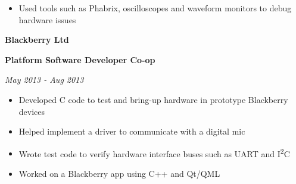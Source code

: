 \documentclass{article}
\newenvironment{name}{\fontfamily{phv}\selectfont\bfseries\normalsize}{\par}
\newenvironment{colorheading}{\fontfamily{phv}\selectfont\bfseries\normalsize\color{darkcyan}}{\par}
\newenvironment{metadata}{\fontfamily{phv}\selectfont\itshape\small\color{darkgray}}{\par}
\newenvironment{itemizedbody}{\fontfamily{phv}\selectfont\small\begin{itemize}}{\end{itemize}\par}
\newenvironment{experience}[2]%
{%
	\begin{minipage}{0.6\linewidth}\begin{flushleft}#1\end{flushleft}\end{minipage}%
	\hfill%
	\begin{minipage}{0.3\linewidth}\begin{flushright}#2\end{flushright}\end{minipage}%
}%
{}
\newcommand{\lineitem}{\item[{$\to$}]}
\begin{document}
\begin{minipage}[t]{0.6\linewidth}
\begin{itemizedbody}
  	  \lineitem Used tools such as Phabrix, oscilloscopes and waveform monitors to debug hardware issues
		\end{itemizedbody}
		\smallskip
  	\begin{experience}
  	{
  	  \begin{name}Blackberry Ltd\end{name}
  	  \begin{colorheading}Platform Software Developer Co-op\end{colorheading}
  	}
  	{
  	  \begin{metadata}May 2013 - Aug 2013\end{metadata}
  	}
		\end{experience}
  	\begin{itemizedbody}
  	  \lineitem Developed C code to test and bring-up hardware in prototype Blackberry devices
  	  \lineitem Helped implement a driver to communicate with a digital mic
  	  \lineitem Wrote test code to verify hardware interface buses such as UART and I\textsuperscript{2}C
  	  \lineitem Worked on a Blackberry app using C++ and Qt/QML
  	\end{itemizedbody}

\end{minipage}
\end{document}
